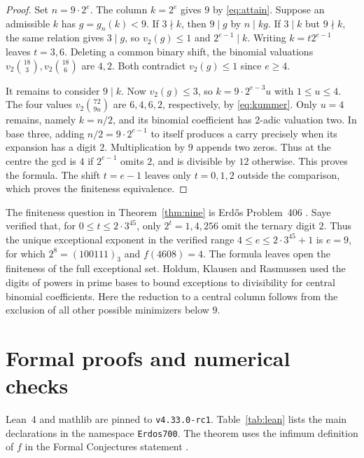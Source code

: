 \documentclass[a4paper,11pt]{article}
\newcommand{\colg}[2]{g_{#1}(#2)}
\newcommand{\leanname}[1]{{\small\texttt{\detokenize{#1}}}}
\begin{document}
\begin{proof}
Set \(n=9\cdot2^e\). The column \(k=2^e\) gives \(9\) by
\eqref{eq:attain}. Suppose an admissible \(k\) has \(g=\colg nk<9\).
If \(3\nmid k\), then \(9\mid g\) by \(n\mid kg\). If \(3\mid k\)
but \(9\nmid k\), the same relation gives \(3\mid g\), so \(v_2(g)\le1\)
and \(2^{e-1}\mid k\). Writing \(k=t2^{e-1}\) leaves \(t=3,6\).
Deleting a common binary shift, the binomial valuations
\(v_2\binom{18}{3},v_2\binom{18}{6}\) are \(4,2\). Both contradict
\(v_2(g)\le1\) since \(e\ge4\).

It remains to consider \(9\mid k\). Now \(v_2(g)\le3\), so
\(k=9\cdot2^{e-3}u\) with \(1\le u\le4\). The four values
\(v_2\binom{72}{9u}\) are \(6,4,6,2\), respectively, by
\eqref{eq:kummer}. Only \(u=4\) remains, namely \(k=n/2\), and its
binomial coefficient has 2-adic valuation two. In base three, adding
\(n/2=9\cdot2^{e-1}\) to itself produces a carry precisely when its
expansion has a digit \(2\). Multiplication by \(9\) appends two zeros.
Thus at the centre the gcd is \(4\) if \(2^{e-1}\) omits \(2\),
and is divisible by \(12\) otherwise. This proves the formula. The
shift \(t=e-1\) leaves only \(t=0,1,2\) outside the comparison, which
proves the finiteness equivalence.
\end{proof}

The finiteness question in Theorem~\ref{thm:nine} is Erd\H{o}s
Problem~406 \cite{digits}. Saye \cite{Saye} verified that, for
\(0\le t\le2\cdot3^{45}\), only \(2^t=1,4,256\) omit the ternary
digit \(2\). Thus the unique exceptional exponent in the verified
range \(4\le e\le2\cdot3^{45}+1\) is \(e=9\), for which
\(2^8=(100111)_3\) and \(f(4608)=4\). The formula leaves open the
finiteness of the full exceptional set. Holdum, Klausen and Rasmussen
\cite{HKR} used the digits of powers in prime bases to bound exceptions
to divisibility for central binomial coefficients. Here the reduction
to a central column follows from the exclusion of all other possible
minimizers below \(9\).

\appendix
\section{Formal proofs and numerical checks}\label{sec:verification}

Lean~4 and mathlib are pinned to \texttt{v4.33.0-rc1}.
Table~\ref{tab:lean} lists the main declarations in the namespace
\texttt{Erdos700}. The theorem \leanname{equality_sets} uses the infimum
definition of \(f\) in the Formal Conjectures statement \cite{formal}.
\end{document}
